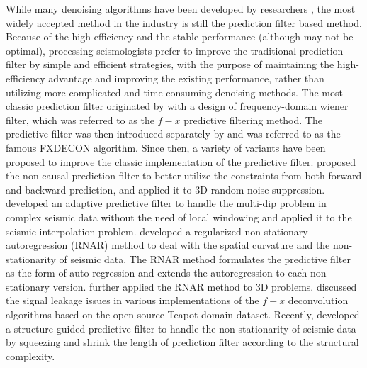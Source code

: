 While many denoising algorithms have been developed by researchers , the most widely accepted method in the industry is still the prediction filter based method. Because of the high efficiency and the stable performance (although may not be optimal), processing seismologists prefer to improve the traditional prediction filter by simple and efficient strategies, with the purpose of maintaining the high-efficiency advantage and improving the existing performance, rather than utilizing more complicated and time-consuming denoising methods. The most classic prediction filter originated by \cite{canales1984} with a design of frequency-domain wiener filter, which was referred to as the $f-x$ predictive filtering method. The predictive filter was then introduced separately by \cite{gulunay1986fxdecon} and was referred to as the famous FXDECON algorithm. Since then, a variety of variants have been proposed to improve the classic implementation of the predictive filter. \cite{fxydecon} proposed the non-causal prediction filter to better utilize the constraints from both forward and backward prediction, and applied it to 3D random noise suppression. \cite{naghizadeh2009f} developed an adaptive predictive filter to handle the multi-dip problem in complex seismic data without the need of local windowing and applied it to the seismic interpolation problem.  \cite{guochang2012} developed a regularized non-stationary autoregression (RNAR) method to deal with the spatial curvature and the non-stationarity of seismic data. The RNAR method formulates the predictive filter as the form of auto-regression and extends the autoregression to each non-stationary version. \cite{guochang2013} further applied the RNAR method to 3D problems.  \cite{fx2017} discussed the signal leakage issues in various implementations of the $f-x$ deconvolution algorithms based on the open-source Teapot domain dataset. Recently, \cite{fuchao2020} developed a structure-guided predictive filter to handle the non-stationarity of seismic data by squeezing and shrink the length of prediction filter according to the structural complexity. 
 

